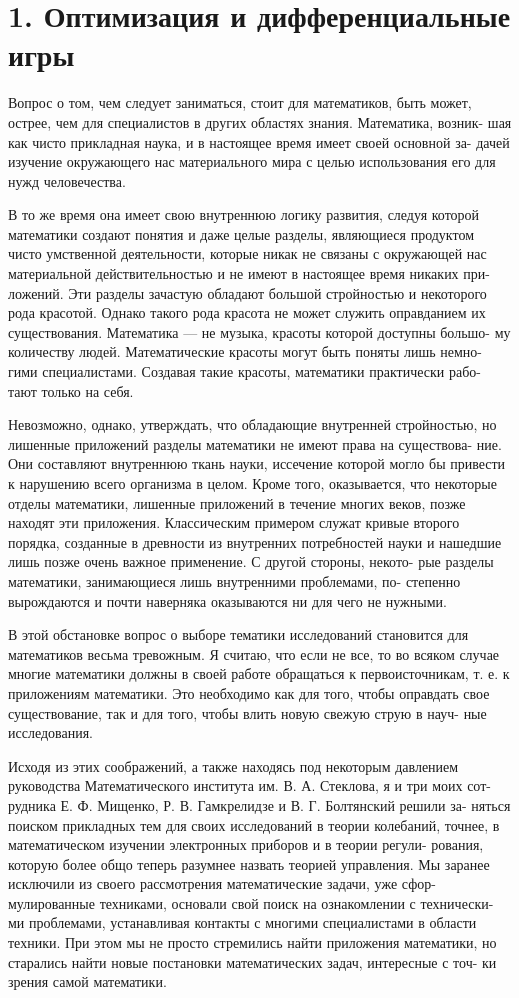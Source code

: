 \documentclass[10pt]{article}
\begin{document}
\section*{1. Оптимизация и дифференциальные игры}
Вопрос о том, чем следует заниматься, стоит для математиков, быть может, острее, чем для специалистов в других областях знания. Математика, возник- шая как чисто прикладная наука, и в настоящее время имеет своей основной за- дачей изучение окружающего нас материального мира с целью использования его для нужд человечества.

В то же время она имеет свою внутреннюю логику развития, следуя которой математики создают понятия и даже целые разделы, являющиеся продуктом чисто умственной деятельности, которые никак не связаны с окружающей нас материальной действительностью и не имеют в настоящее время никаких при- ложений. Эти разделы зачастую обладают большой стройностью и некоторого рода красотой. Однако такого рода красота не может служить оправданием их существования. Математика — не музыка, красоты которой доступны большо- му количеству людей. Математические красоты могут быть поняты лишь немно- гими специалистами. Создавая такие красоты, математики практически рабо- тают только на себя.

Невозможно, однако, утверждать, что обладающие внутренней стройностью, но лишенные приложений разделы математики не имеют права на существова- ние. Они составляют внутреннюю ткань науки, иссечение которой могло бы привести к нарушению всего организма в целом. Кроме того, оказывается, что некоторые отделы математики, лишенные приложений в течение многих веков, позже находят эти приложения. Классическим примером служат кривые второго порядка, созданные в древности из внутренних потребностей науки и нашедшие лишь позже очень важное применение. С другой стороны, некото- рые разделы математики, занимающиеся лишь внутренними проблемами, по- степенно вырождаются и почти наверняка оказываются ни для чего не нужными.

В этой обстановке вопрос о выборе тематики исследований становится для математиков весьма тревожным. Я считаю, что если не все, то во всяком случае многие математики должны в своей работе обращаться к первоисточникам, т. е. к приложениям математики. Это необходимо как для того, чтобы оправдать свое существование, так и для того, чтобы влить новую свежую струю в науч- ные исследования.

Исходя из этих соображений, а также находясь под некоторым давлением руководства Математического института им. В. А. Стеклова, я и три моих сот- рудника Е. Ф. Мищенко, Р. В. Гамкрелидзе и В. Г. Болтянский решили за- няться поиском прикладных тем для своих исследований в теории колебаний, точнее, в математическом изучении электронных приборов и в теории регули- рования, которую более общо теперь разумнее назвать теорией управления. Мы заранее исключили из своего рассмотрения математические задачи, уже сфор- мулированные техниками, основали свой поиск на ознакомлении с технически- ми проблемами, устанавливая контакты с многими специалистами в области техники. При этом мы не просто стремились найти приложения математики, но старались найти новые постановки математических задач, интересные с точ- ки зрения самой математики.
\end{document}
